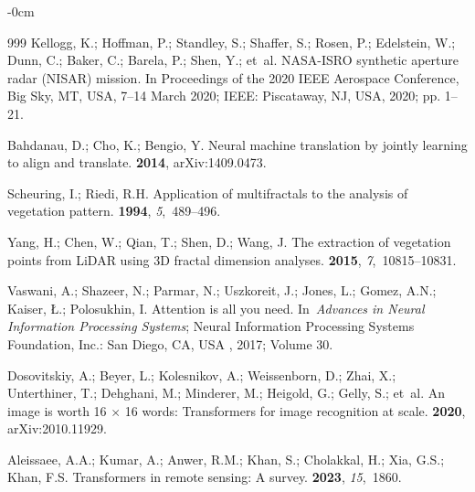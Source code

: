 \documentclass[remotesensing,article,accept,pdftex,moreauthors]{Definitions/mdpi}
\begin{document}
\begin{adjustwidth}{-\extralength}{0cm}
\begin{thebibliography}{999}
Kellogg, K.; Hoffman, P.; Standley, S.; Shaffer, S.; Rosen, P.; Edelstein, W.;
  Dunn, C.; Baker, C.; Barela, P.; Shen, Y.;  et~al.
\newblock NASA-ISRO synthetic aperture radar (NISAR) mission.
\newblock In Proceedings of the 2020 IEEE Aerospace Conference, Big Sky, MT, USA, 7--14 March 2020; IEEE: Piscataway, NJ, USA, 2020;
  pp. 1--21.

Bahdanau, D.; Cho, K.; Bengio, Y.
\newblock Neural machine translation by jointly learning to align and
  translate.
 {\bf 2014}, arXiv:1409.0473.

Scheuring, I.; Riedi, R.H.
\newblock Application of multifractals to the analysis of vegetation pattern.
 {\bf 1994}, {\em 5},~489--496.

Yang, H.; Chen, W.; Qian, T.; Shen, D.; Wang, J.
\newblock The extraction of vegetation points from LiDAR using 3D fractal
  dimension analyses.
 {\bf 2015}, {\em 7},~10815--10831.

Vaswani, A.; Shazeer, N.; Parmar, N.; Uszkoreit, J.; Jones, L.; Gomez, A.N.;
  Kaiser, {\L}.; Polosukhin, I.
\newblock Attention is all you need.
\newblock In~{\em Advances in Neural Information Processing Systems}; Neural Information Processing Systems Foundation, Inc.: San Diego, CA, USA
, 2017; Volume 30.

Dosovitskiy, A.; Beyer, L.; Kolesnikov, A.; Weissenborn, D.; Zhai, X.;
  Unterthiner, T.; Dehghani, M.; Minderer, M.; Heigold, G.; Gelly, S.;  et~al.
\newblock An image is worth 16 $\times$ 16 words: Transformers for image recognition at
  scale.
 {\bf 2020}, arXiv:2010.11929.

Aleissaee, A.A.; Kumar, A.; Anwer, R.M.; Khan, S.; Cholakkal, H.; Xia, G.S.;
  Khan, F.S.
\newblock Transformers in remote sensing: A survey.
 {\bf 2023}, {\em 15},~1860.


\end{thebibliography}
\end{adjustwidth}
\end{document}
